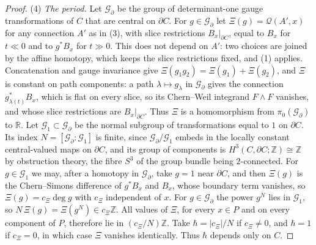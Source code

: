 \documentclass[11pt]{amsart}
\theoremstyle{definition}
\theoremstyle{remark}
\theoremstyle{plain}
\numberwithin{equation}{section}
\newcommand{\ZZ}{\mathbb{Z}}
\newcommand{\RR}{\mathbb{R}}
\begin{document}
\begin{proof}
(4) \emph{The period.} Let $\mathcal G_\partial$ be the group of determinant-one gauge
transformations of $C$ that are central on $\partial C$. For $g\in\mathcal G_\partial$ let
$\Xi(g)=\mathcal Q(A',x)$ for any connection $A'$ as in (3), with slice restrictions
$B_x|_{\partial C}$, equal to $B_x$ for $t\ll0$ and to $g^*B_x$ for $t\gg0$. This does not
depend on $A'$: two choices are joined by the affine homotopy, which keeps the slice
restrictions fixed, and (1) applies. Concatenation and gauge invariance give
$\Xi(g_1g_2)=\Xi(g_1)+\Xi(g_2)$, and $\Xi$ is constant on path components: a path
$\lambda\mapsto g_\lambda$ in $\mathcal G_\partial$ gives the connection
$g_{\lambda(t)}^*B_x$, which is flat on every slice, so its Chern--Weil integrand
$F\wedge F$ vanishes, and whose slice restrictions are $B_x|_{\partial C}$. Thus $\Xi$ is a
homomorphism from $\pi_0(\mathcal G_\partial)$ to $\RR$. Let $\mathcal G_1\subset\mathcal G_\partial$ be the normal subgroup of transformations equal
to $1$ on $\partial C$. Its index $N=[\mathcal G_\partial:\mathcal G_1]$ is finite, since
$\mathcal G_\partial/\mathcal G_1$ embeds in the locally constant central-valued maps on
$\partial C$, and its group of components is $H^3(C,\partial C;\ZZ)\cong\ZZ$ by obstruction
theory, the fibre $S^3$ of the group bundle being $2$-connected. For $g\in\mathcal G_1$ we
may, after a homotopy in $\mathcal G_\partial$, take $g=1$ near $\partial C$, and then
$\Xi(g)$ is the Chern--Simons difference of $g^*B_x$ and $B_x$, whose boundary term vanishes,
so $\Xi(g)=c_\Xi\deg g$ with $c_\Xi$ independent of $x$. For $g\in\mathcal G_\partial$ the
power $g^N$ lies in $\mathcal G_1$, so $N\,\Xi(g)=\Xi(g^N)\in c_\Xi\ZZ$. All values of $\Xi$,
for every $x\in P$ and on every component of $P$, therefore lie in $(c_\Xi/N)\ZZ$. Take
$\hbar=|c_\Xi|/N$ if $c_\Xi\ne0$, and $\hbar=1$ if $c_\Xi=0$, in which case $\Xi$ vanishes
identically. Thus $\hbar$ depends only on $C$.
\end{proof}
\end{document}
